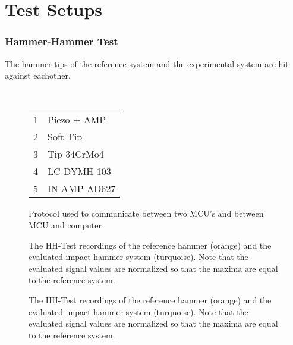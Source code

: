 \chapter{Test Setups}
\label{chap:\currfilebase}

\subsection{Hammer-Hammer Test}

The hammer tips of the reference system and the experimental system are hit against eachother.
\begin{figure}[!htb]
    \centering
    
    \\[0.5em]
    \footnotesize
		\begin{tabular}{c@{ :\hskip 0.5em}l}
			\toprule
            \large{1} & Piezo + \ac{AMP}\\
            \large{2} & Soft Tip\\
            \large{3} & Tip 34CrMo4\\
            \large{4} & \ac{LC} DYMH-103\\
            \large{5} & \ac{IN-AMP} AD627\\
			\bottomrule
		\end{tabular}
	\normalsize
    \caption[MCU communication protocol]{Protocol used to communicate between two MCU's and between MCU and computer}
    \label{tab:mcu_com_protocol}
\end{figure}

\begin{figure}[!htb]
    \centering
    
    \caption[HH-Test comparison]{The HH-Test recordings of the reference hammer (orange) and the evaluated impact hammer system (turquoise). Note that the evaluated signal values are normalized so that the maxima are equal to the reference system.}
    \label{tab:mcu_com_protocol}
\end{figure}
\begin{figure}[!htb]
    \centering
    
    \caption[HH-Test comparison]{The HH-Test recordings of the reference hammer (orange) and the evaluated impact hammer system (turquoise). Note that the evaluated signal values are normalized so that the maxima are equal to the reference system.}
    \label{fig:HH_noise}
\end{figure}

